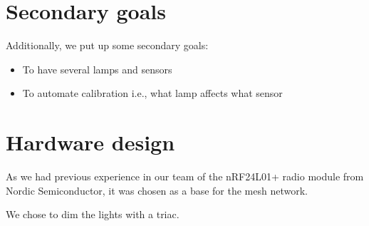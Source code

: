 \documentclass[11pt]{article}
\begin{document}
	\section{Secondary goals}
   Additionally, we put up some secondary goals:
	\begin{itemize}
		\item To have several lamps and sensors
		\item To automate calibration i.e., what lamp affects what sensor
	\end{itemize}

   \section{Hardware design}
   As we had previous experience in our team of the nRF24L01+ radio module from
   Nordic Semiconductor, it was chosen as a base for the mesh network.

   We chose to dim the lights with a triac.
\end{document}
